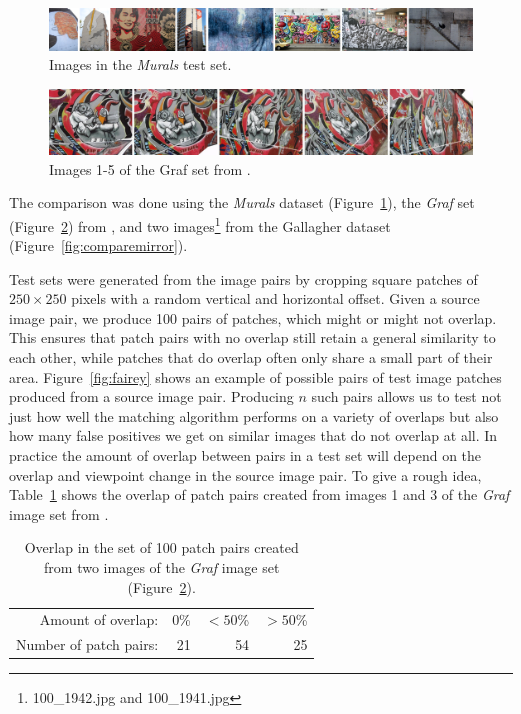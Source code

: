 \begin{figure}[t]
	\centering
	\includegraphics[width=\textwidth]{images/murals}
	\caption{Images in the \emph{Murals} test set.}
	\label{fig:murals}
\end{figure}

\begin{figure}[htb]
	\centering
	\includegraphics[width=\columnwidth]{images/graf12345.jpg}
	\caption{Images 1-5 of the Graf set from \cite{mikolajczyk2005performance}.}
	\label{fig:Graf}
\end{figure}


The comparison was done using the \emph{Murals} dataset 
(Figure~\ref{fig:murals}), the \emph{Graf} set (Figure~\ref{fig:Graf}) 
from \cite{mikolajczyk2005performance}, and two 
images\footnote{100\_1942.jpg and 100\_1941.jpg} from the Gallagher 
dataset \cite{gallagher2008} (Figure~\ref{fig:comparemirror}).

Test sets were generated from the image pairs by cropping square patches of
$250\!\times\!250$ pixels with a random vertical and horizontal offset.  
Given a source image pair, we produce 100 pairs of patches, which might or might not overlap.  
This ensures that patch pairs with no overlap still retain a general similarity to each 
other, while patches that do overlap often only share a small 
part of their area. Figure~\ref{fig:fairey} shows an example of 
possible pairs of test image patches produced from a source image pair.  
Producing $n$ such pairs allows us to test not just how well the 
matching algorithm performs on a variety of overlaps but also how many 
false positives we get on similar images that do not overlap at all. In 
practice the amount of overlap between pairs in a test set will depend 
on the overlap and viewpoint change in the source image pair.  To give a 
rough idea, Table~\ref{table:overlap} shows the overlap of patch pairs 
created from images 1 and 3 of the \emph{Graf} image set from 
\cite{mikolajczyk2005performance}.

\begin{table}[htb]
\caption{Overlap in the set of 100 patch pairs created from two images 
of the \emph{Graf} image set (Figure~\ref{fig:Graf}).}
\label{table:overlap}
    \centering
\begin{tabular}{r*{3}{r}}
\hline
    Amount of overlap: & 0\% & $< 50$\% & $> 50$\%  \\
    \noalign{\smallskip}
    Number of patch pairs: & 21 & 54 & 25 \\
    \hline
\end{tabular}
\end{table}


